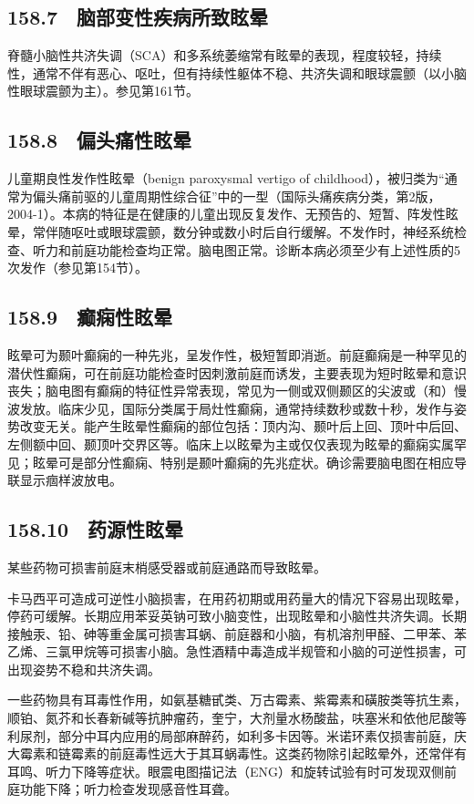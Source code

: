 \subsection{158.7　脑部变性疾病所致眩晕}

脊髓小脑性共济失调（SCA）和多系统萎缩常有眩晕的表现，程度较轻，持续性，通常不伴有恶心、呕吐，但有持续性躯体不稳、共济失调和眼球震颤（以小脑性眼球震颤为主）。参见第161节。

\subsection{158.8　偏头痛性眩晕}

儿童期良性发作性眩晕（benign paroxysmal vertigo of
childhood），被归类为“通常为偏头痛前驱的儿童周期性综合征”中的一型（国际头痛疾病分类，第2版，2004-1）。本病的特征是在健康的儿童出现反复发作、无预告的、短暂、阵发性眩晕，常伴随呕吐或眼球震颤，数分钟或数小时后自行缓解。不发作时，神经系统检查、听力和前庭功能检查均正常。脑电图正常。诊断本病必须至少有上述性质的5次发作（参见第154节）。

\subsection{158.9　癫痫性眩晕}

眩晕可为颞叶癫痫的一种先兆，呈发作性，极短暂即消逝。前庭癫痫是一种罕见的潜伏性癫痫，可在前庭功能检查时因刺激前庭而诱发，主要表现为短时眩晕和意识丧失；脑电图有癫痫的特征性异常表现，常见为一侧或双侧颞区的尖波或（和）慢波发放。临床少见，国际分类属于局灶性癫痫，通常持续数秒或数十秒，发作与姿势改变无关。能产生眩晕性癫痫的部位包括：顶内沟、颞叶后上回、顶叶中后回、左侧额中回、颞顶叶交界区等。临床上以眩晕为主或仅仅表现为眩晕的癫痫实属罕见；眩晕可是部分性癫痫、特别是颞叶癫痫的先兆症状。确诊需要脑电图在相应导联显示痼样波放电。

\subsection{158.10　药源性眩晕}

某些药物可损害前庭末梢感受器或前庭通路而导致眩晕。

卡马西平可造成可逆性小脑损害，在用药初期或用药量大的情况下容易出现眩晕，停药可缓解。长期应用苯妥英钠可致小脑变性，出现眩晕和小脑性共济失调。长期接触汞、铅、砷等重金属可损害耳蜗、前庭器和小脑，有机溶剂甲醛、二甲苯、苯乙烯、三氯甲烷等可损害小脑。急性酒精中毒造成半规管和小脑的可逆性损害，可出现姿势不稳和共济失调。

一些药物具有耳毒性作用，如氨基糖甙类、万古霉素、紫霉素和磺胺类等抗生素，顺铂、氮芥和长春新碱等抗肿瘤药，奎宁，大剂量水杨酸盐，呋塞米和依他尼酸等利尿剂，部分中耳内应用的局部麻醉药，如利多卡因等。米诺环素仅损害前庭，庆大霉素和链霉素的前庭毒性远大于其耳蜗毒性。这类药物除引起眩晕外，还常伴有耳鸣、听力下降等症状。眼震电图描记法（ENG）和旋转试验有时可发现双侧前庭功能下降；听力检查发现感音性耳聋。

